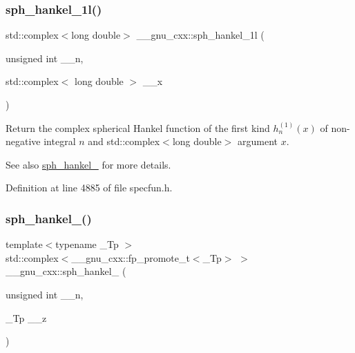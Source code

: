 \subsubsection{\texorpdfstring{sph\+\_\+hankel\+\_\+1l()}{sph\_hankel\_1l()}\hspace{0.1cm}{\footnotesize\ttfamily [2/2]}}
{\footnotesize\ttfamily std\+::complex$<$long double$>$ \+\_\+\+\_\+gnu\+\_\+cxx\+::sph\+\_\+hankel\+\_\+1l (\begin{DoxyParamCaption}\item[{unsigned int}]{\+\_\+\+\_\+n,  }\item[{std\+::complex$<$ long double $>$}]{\+\_\+\+\_\+x }\end{DoxyParamCaption})\hspace{0.3cm}{\ttfamily [inline]}}

Return the complex spherical Hankel function of the first kind $ h^{(1)}_n(x) $ of non-\/negative integral $ n $ and {\ttfamily std\+::complex$<$long double$>$} argument $ x $.

\begin{DoxySeeAlso}{See also}
\hyperlink{group__gnu__math__spec__func_ga4424f565fb224ab88b177beb65d08305}{sph\+\_\+hankel\+\_} for more details. 
\end{DoxySeeAlso}


Definition at line 4885 of file specfun.\+h.

\mbox{\label{group__gnu__math__spec__func_ga1ca08866a25e3637b04c57ff5a0c36a5}} 
\subsubsection{\texorpdfstring{sph\+\_\+hankel\+\_()}{sph\_hankel\_2()}\hspace{0.1cm}{\footnotesize\ttfamily [1/2]}}
{\footnotesize\ttfamily template$<$typename \+\_\+\+Tp $>$ \\
std\+::complex$<$\+\_\+\+\_\+gnu\+\_\+cxx\+::fp\+\_\+promote\+\_\+t$<$\+\_\+\+Tp$>$ $>$ \+\_\+\+\_\+gnu\+\_\+cxx\+::sph\+\_\+hankel\+\_ (\begin{DoxyParamCaption}\item[{unsigned int}]{\+\_\+\+\_\+n,  }\item[{\+\_\+\+Tp}]{\+\_\+\+\_\+z }\end{DoxyParamCaption})\hspace{0.3cm}{\ttfamily [inline]}}

